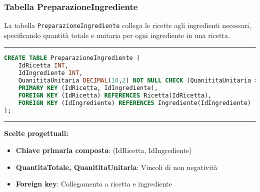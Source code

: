\subsubsection{Tabella PreparazioneIngrediente}

La tabella \texttt{PreparazioneIngrediente} collega le ricette agli ingredienti necessari, specificando quantità totale e unitaria per ogni ingrediente in una ricetta.

\noindent\rule{\textwidth}{0.4pt}
\begin{lstlisting}[language=SQL, style=sqlstyle]
CREATE TABLE PreparazioneIngrediente (
    IdRicetta INT,
    IdIngrediente INT,
    QuanititaUnitaria DECIMAL(10,2) NOT NULL CHECK (QuanititaUnitaria >= 0),
    PRIMARY KEY (IdRicetta, IdIngrediente),
    FOREIGN KEY (IdRicetta) REFERENCES Ricetta(IdRicetta),
    FOREIGN KEY (IdIngrediente) REFERENCES Ingrediente(IdIngrediente)
);
\end{lstlisting}
\noindent\rule{\textwidth}{0.4pt}

\textbf{Scelte progettuali:}
\begin{itemize}
    \item \textbf{Chiave primaria composta}: (IdRicetta, IdIngrediente)
    \item \textbf{QuantitaTotale, QuanititaUnitaria}: Vincoli di non negatività
    \item \textbf{Foreign key}: Collegamento a ricetta e ingrediente
\end{itemize}

